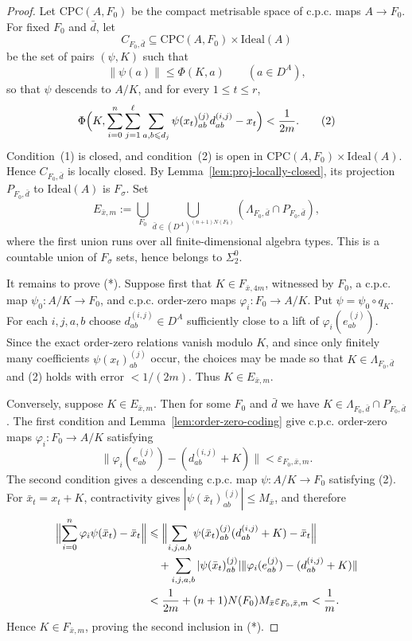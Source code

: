 \documentclass[12pt,fleqn,a4paper]{amsart}
\renewcommand{\le}{\leqslant}
\numberwithin{equation}{section}
\theoremstyle{definition}
\newcommand{\Ideal}{\mathrm{Ideal}}
\begin{document}
\begin{proof}
Let $\mathrm{CPC}(A,F_0)$ be the compact metrisable space of c.p.c. maps
$A\to F_0$.  For fixed $F_0$ and $\bar d$, let
\[
C_{F_0,\bar d}\subseteq \mathrm{CPC}(A,F_0)\times\Ideal(A)
\]
be the set of pairs $(\psi,K)$ such that
\[
        \|\psi(a)\|\le \Phi(K,a)\qquad(a\in D^A),                    \tag{1}
\]
so that $\psi$ descends to $A/K$, and for every $1\le t\le r$,
\[
\Phi\Bigl(
K,
\sum_{i=0}^{n}\sum_{j=1}^{\ell}\sum_{a,b\le d_j}
\psi(x_t)^{(j)}_{ab}d_{ab}^{(i,j)}-x_t
\Bigr)
<\frac{1}{2m}.                                                        \tag{2}
\]
Condition~(1) is closed, and condition~(2) is open in
$\mathrm{CPC}(A,F_0)\times\Ideal(A)$.  Hence $C_{F_0,\bar d}$ is locally closed.
By Lemma~\ref{lem:proj-locally-closed}, its projection
$P_{F_0,\bar d}$ to $\Ideal(A)$ is $F_\sigma$.  Set
\[
        E_{\bar x,m}:=
        \bigcup_{F_0}\bigcup_{\bar d\in(D^A)^{(n+1)N(F_0)}}
        (\Lambda_{F_0,\bar d}\cap P_{F_0,\bar d}),
\]
where the first union runs over all finite-dimensional algebra types.  This is a
countable union of $F_\sigma$ sets, hence belongs to $\Sigma^0_2$.

It remains to prove (*).  Suppose first that $K\in F_{\bar x,4m}$, witnessed by
$F_0$, a c.p.c. map $\psi_0:A/K\to F_0$, and c.p.c. order-zero maps
$\varphi_i:F_0\to A/K$.  Put $\psi=\psi_0\circ q_K$.  For each $i,j,a,b$ choose
$d_{ab}^{(i,j)}\in D^A$ sufficiently close to a lift of
$\varphi_i(e_{ab}^{(j)})$.  Since the exact order-zero relations vanish modulo $K$,
and since only finitely many coefficients $\psi(x_t)^{(j)}_{ab}$ occur, the choices may
be made so that $K\in\Lambda_{F_0,\bar d}$ and (2) holds with error $<1/(2m)$.
Thus $K\in E_{\bar x,m}$.

Conversely, suppose $K\in E_{\bar x,m}$.  Then for some $F_0$ and $\bar d$ we have
$K\in\Lambda_{F_0,\bar d}\cap P_{F_0,\bar d}$.  The first condition and
Lemma~\ref{lem:order-zero-coding} give c.p.c. order-zero maps
$\varphi_i:F_0\to A/K$ satisfying
\[
\|\varphi_i(e_{ab}^{(j)})-(d_{ab}^{(i,j)}+K)\|
<\varepsilon_{F_0,\bar x,m}.
\]
The second condition gives a descending c.p.c. map $\psi:A/K\to F_0$ satisfying (2).
For $\bar x_t=x_t+K$, contractivity gives
$|\psi(\bar x_t)^{(j)}_{ab}|\le M_{\bar x}$, and therefore
\[
\begin{aligned}
\Bigl\|\sum_{i=0}^{n}\varphi_i\psi(\bar x_t)-\bar x_t\Bigr\|
&\le
\Bigl\|
\sum_{i,j,a,b}\psi(\bar x_t)^{(j)}_{ab}(d_{ab}^{(i,j)}+K)-\bar x_t
\Bigr\| \\
&\quad+
\sum_{i,j,a,b}|\psi(\bar x_t)^{(j)}_{ab}|
\|\varphi_i(e_{ab}^{(j)})-(d_{ab}^{(i,j)}+K)\| \\
&<\frac1{2m}+(n+1)N(F_0)M_{\bar x}\varepsilon_{F_0,\bar x,m}
<\frac1m.
\end{aligned}
\]
Hence $K\in F_{\bar x,m}$, proving the second inclusion in (*).
\end{proof}
\end{document}
